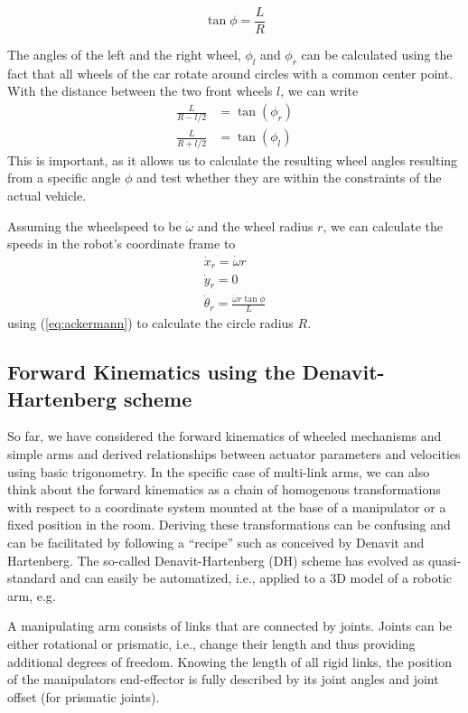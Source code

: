 \begin{equation}\label{eq:ackermann}
\tan \phi = \frac{L}{R}
\end{equation}

The angles of the left and the right wheel, $ \phi_l$ and $ \phi_r$ can be calculated using the fact that all wheels of the car rotate around circles with a common center point. With the distance between the two front wheels $l$, we can write
\begin{eqnarray}
\frac{L}{R-l/2}&=\tan{(\phi_r)}\\
\frac{L}{R+l/2}&=\tan{(\phi_l)}
\end{eqnarray}
This is important, as it allows us to calculate the resulting wheel angles resulting from a specific angle $\phi$ and test whether they are within the constraints of the actual vehicle.

Assuming the wheelspeed to be $\dot{\omega}$ and the wheel radius $r$, we can calculate the speeds in the robot's coordinate frame to
\begin{eqnarray}
\dot{x}_r=\dot{\omega}r\\
\dot{y}_r=0\\
\dot{\theta}_r=\frac{\dot{\omega}r\tan\phi}{L}
\end{eqnarray}
using (\ref{eq:ackermann}) to calculate the circle radius $R$.

\subsection{Forward Kinematics using the Denavit-Hartenberg scheme}
So far, we have considered the forward kinematics of wheeled mechanisms and simple arms and derived relationships between actuator parameters and velocities using basic trigonometry. In the specific case of multi-link arms, we can also think about the forward kinematics as a chain of homogenous transformations with respect to a coordinate system mounted at the base of a manipulator or a fixed position in the room. Deriving these transformations can be confusing and can be facilitated by following a ``recipe'' such as conceived by Denavit and Hartenberg. The so-called Denavit-Hartenberg (DH) scheme has evolved as quasi-standard and can easily be automatized, i.e., applied to a 3D model of a robotic arm, e.g.

A manipulating arm consists of links that are connected by joints. Joints can be either rotational or prismatic, i.e., change their length and thus providing additional degrees of freedom. Knowing the length of all rigid links, the position of the manipulators end-effector is fully described by its joint angles and joint offset (for prismatic joints).

